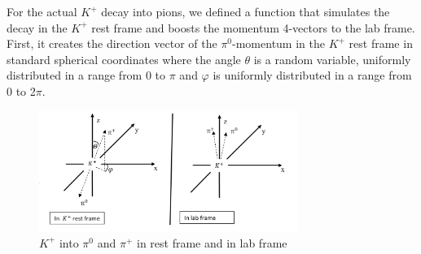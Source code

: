 \documentclass[a4paper,parskip,11pt, DIV12]{scrreprt}
\begin{document}
	For the actual $K^+$ decay into pions, we defined a function that simulates the decay in the $K^+$ rest frame and boosts the momentum 4-vectors to the lab frame.
	First, it creates the direction vector of the $\pi^0$-momentum in the $K^+$ rest frame in standard spherical coordinates where the angle $\theta$ is a random variable, uniformly distributed in a range from 0 to $\pi$ and $\varphi$ is uniformly distributed in a range from 0 to 2$\pi$. 
	\begin{figure}[H] 
		\centering
		\includegraphics[width=0.75\textwidth]{Frames.png} 
		\caption{$K^+$ into $\pi^0$ and $\pi^+$ in rest frame and in lab frame}
		\label{fig:2}    
	\end{figure}
	
\end{document}
